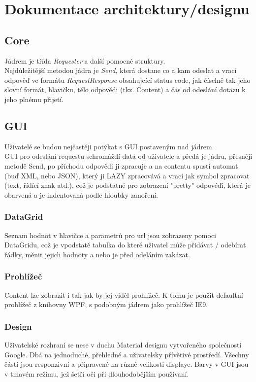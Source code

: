 \documentclass[a4paper]{article}
\begin{document}
\section{Dokumentace architektury/designu}
    \subsection{Core}
        Jádrem je třída \textit{Requester} a další pomocné struktury.\\
        Nejdůležitější metodou jádra je \textit{Send}, která dostane
        co a kam odeslat a vrací odpověď ve formátu \textit{RequestResponse}
        obsahujcící status code, jak číselně tak jeho slovní formát,
        hlavičku, tělo odpovědi (tkz. Content) a čas od odeslání dotazu k jeho plnému přijetí.\\
    \subsection{GUI}
        Uživatelé se budou nejčastěji potýkat s GUI postaveným nad jádrem.\\
        GUI pro odeslání requestu schromáždí data od uživatele a předá je jádru,
        přesněji metodě Send, po příchodu odpovědi ji zpracuje a na contentu spustí
        automat (buď XML, nebo JSON), který ji LAZY zpracovává a vrací
        jak symbol zpracovat (text, řídící znak atd.), což je podstatné pro
        zobrazení "pretty" odpovéďi, která je obarvená a je indentovaná podle
        hloubky zanoření.
        \subsubsection{DataGrid}
            Seznam hodnot v hlavičce a parametrů pro url jsou zobrazeny pomoci
            DataGridu, což je vpodstatě tabulka do které uživatel může přidávat / 
            odebírat řádky, měnit jejich hodnoty a nebo je před odeláním zakázat.
        \subsubsection{Prohlížeč}
            Content lze zobrazit i tak jak by jej viděl prohlížeč.
            K tomu je použit defaultní prohlížeč z knihovny WPF,
            s podobným jádrem jako prohlížeč IE9.
        \subsubsection{Design}
            Uživatelské rozhraní se nese v duchu Material designu vytvořeného
            společností Google. Dbá na jednoduché, přehledné a uživatelsky přívětivé
            prostředí. Všechny části jsou responzivní a připravené na různé velikosti displaye.
            Barvy v GUI jsou v tmavém režimu, jež šetří oči při dlouhodobějším používaní. 
\end{document}
